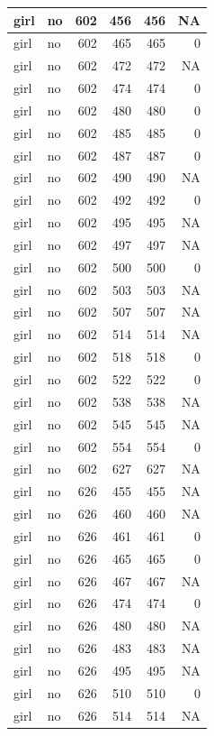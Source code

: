 \documentclass[man]{apa6}
\begin{document}
\begin{tabular}{l|l|r|r|r|r}
\hline
girl & no & 602 & 456 & 456 & NA\\
\hline
girl & no & 602 & 465 & 465 & 0\\
\hline
girl & no & 602 & 472 & 472 & NA\\
\hline
girl & no & 602 & 474 & 474 & 0\\
\hline
girl & no & 602 & 480 & 480 & 0\\
\hline
girl & no & 602 & 485 & 485 & 0\\
\hline
girl & no & 602 & 487 & 487 & 0\\
\hline
girl & no & 602 & 490 & 490 & NA\\
\hline
girl & no & 602 & 492 & 492 & 0\\
\hline
girl & no & 602 & 495 & 495 & NA\\
\hline
girl & no & 602 & 497 & 497 & NA\\
\hline
girl & no & 602 & 500 & 500 & 0\\
\hline
girl & no & 602 & 503 & 503 & NA\\
\hline
girl & no & 602 & 507 & 507 & NA\\
\hline
girl & no & 602 & 514 & 514 & NA\\
\hline
girl & no & 602 & 518 & 518 & 0\\
\hline
girl & no & 602 & 522 & 522 & 0\\
\hline
girl & no & 602 & 538 & 538 & NA\\
\hline
girl & no & 602 & 545 & 545 & NA\\
\hline
girl & no & 602 & 554 & 554 & 0\\
\hline
girl & no & 602 & 627 & 627 & NA\\
\hline
girl & no & 626 & 455 & 455 & NA\\
\hline
girl & no & 626 & 460 & 460 & NA\\
\hline
girl & no & 626 & 461 & 461 & 0\\
\hline
girl & no & 626 & 465 & 465 & 0\\
\hline
girl & no & 626 & 467 & 467 & NA\\
\hline
girl & no & 626 & 474 & 474 & 0\\
\hline
girl & no & 626 & 480 & 480 & NA\\
\hline
girl & no & 626 & 483 & 483 & NA\\
\hline
girl & no & 626 & 495 & 495 & NA\\
\hline
girl & no & 626 & 510 & 510 & 0\\
\hline
girl & no & 626 & 514 & 514 & NA\\

\end{tabular}
\end{document}
